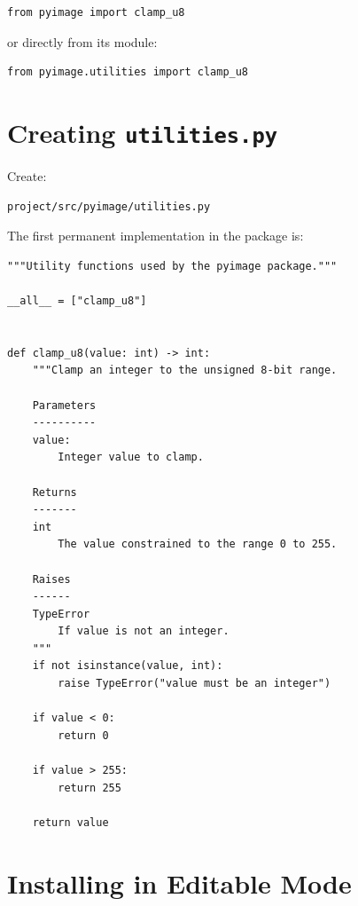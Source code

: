 \begin{verbatim}
from pyimage import clamp_u8
\end{verbatim}

or directly from its module:

\begin{verbatim}
from pyimage.utilities import clamp_u8
\end{verbatim}


\section{Creating \texttt{utilities.py}}
\label{sec:utilities-module}

Create:

\begin{verbatim}
project/src/pyimage/utilities.py
\end{verbatim}

The first permanent implementation in the package is:

\begin{listing}[htbp]
    \caption{Initial implementation of
    \texttt{pyimage.utilities}.}
    \label{lst:utilities-module}

\begin{verbatim}
"""Utility functions used by the pyimage package."""

__all__ = ["clamp_u8"]


def clamp_u8(value: int) -> int:
    """Clamp an integer to the unsigned 8-bit range.

    Parameters
    ----------
    value:
        Integer value to clamp.

    Returns
    -------
    int
        The value constrained to the range 0 to 255.

    Raises
    ------
    TypeError
        If value is not an integer.
    """
    if not isinstance(value, int):
        raise TypeError("value must be an integer")

    if value < 0:
        return 0

    if value > 255:
        return 255

    return value
\end{verbatim}

\end{listing}


\section{Installing \pyimage{} in Editable Mode}
\label{sec:editable-install}

